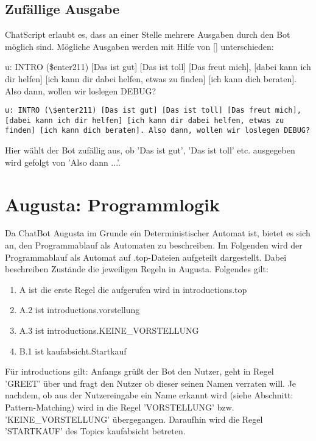 \section{Zufällige Ausgabe}
\label{sec:ChatScript: Zufällige Ausgabe}

ChatScript erlaubt es, dass an einer Stelle mehrere Ausgaben durch den Bot möglich sind. Mögliche Ausgaben werden mit Hilfe von [] unterschieden:

u: INTRO (\$enter211) [Das ist gut] [Das ist toll] [Das freut mich], [dabei kann ich dir helfen] [ich kann dir dabei helfen, etwas zu finden] [ich kann dich beraten]. Also dann, wollen wir loslegen DEBUG?

\begin{lstlisting}[caption={Regel in keyexonesentence.top}]
u: INTRO (\$enter211) [Das ist gut] [Das ist toll] [Das freut mich], [dabei kann ich dir helfen] [ich kann dir dabei helfen, etwas zu finden] [ich kann dich beraten]. Also dann, wollen wir loslegen DEBUG?
\end{lstlisting}

Hier wählt der Bot zufällig aus, ob 'Das ist gut', 'Das ist toll' etc. ausgegeben wird gefolgt von 'Also dann ...'.



\chapter{Augusta: Programmlogik}
\label{sec:Augusta: Programmlogik}

Da ChatBot Augusta im Grunde ein Deterministischer Automat ist, bietet es sich an, den Programmablauf als Automaten zu beschreiben. Im Folgenden wird der Programmablauf als Automat auf .top-Dateien aufgeteilt dargestellt. Dabei beschreiben Zustände die jeweiligen Regeln in Augusta. 
Folgendes gilt:

\begin{enumerate}
\item{A ist die erste Regel die aufgerufen wird in introductions.top} %
\item{A.2 ist introductions.vorstellung}
\item{A.3 ist introductions.KEINE\_VORSTELLUNG}
\item{B.1 ist kaufabsicht.Startkauf}
\end{enumerate}

Für introductions gilt: Anfangs grüßt der Bot den Nutzer, geht in Regel 'GREET' über und fragt den Nutzer ob dieser seinen Namen verraten will. Je nachdem, ob aus der Nutzereingabe ein Name erkannt wird (siehe Abschnitt: Pattern-Matching) wird in die Regel 'VORSTELLUNG' bzw. 'KEINE\_VORSTELLUNG' übergegangen. Daraufhin wird die Regel 'STARTKAUF' des Topics kaufabsicht betreten. 

